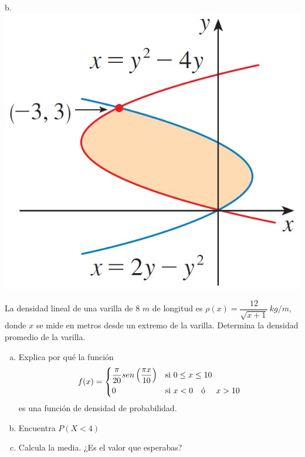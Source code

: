 \documentclass[9pt]{exam}
\begin{document}
\begin{questions}
\begin{multicols}{2}
    b. \includegraphics[scale=.3]{T-E3_2.jpg}
    \end{multicols}

\question La densidad lineal de una varilla de 8 $m$ de longitud es $\rho(x)=\dfrac{12}{\sqrt{x+1}} \, kg/m$, donde $x$ se mide en metros desde un extremo de la varilla. Determina la densidad promedio de la varilla. 

\vskip12pt
\vskip10pt
\question 
\begin{enumerate}[a)]
    \item Explica por qué la función $$ f(x) = \begin{dcases} \dfrac{\pi}{20}sen \left(\dfrac{\pi x}{10}\right) & \text{si } 0 \leq x \leq 10 \\ 0 & \text{si } x < 0 \quad \text{ó }\quad  x > 10 \end{dcases}$$
    es una función de densidad de probabilidad.

    \item Encuentra $P(X<4)$
    \item Calcula la media. ¿Es el valor que esperabas?
\end{enumerate}


\end{questions}
\end{document}
